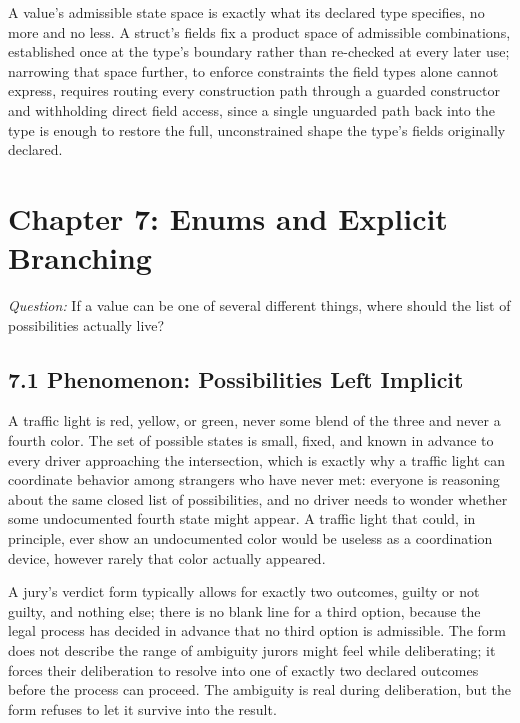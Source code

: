 \documentclass[11pt]{book}
\begin{document}
\begin{invariantbox}
A value's admissible state space is exactly what its declared type specifies, no more and no less. A struct's fields fix a product space of admissible combinations, established once at the type's boundary rather than re-checked at every later use; narrowing that space further, to enforce constraints the field types alone cannot express, requires routing every construction path through a guarded constructor and withholding direct field access, since a single unguarded path back into the type is enough to restore the full, unconstrained shape the type's fields originally declared.
\end{invariantbox}

\clearpage

\chapter*{Chapter 7: Enums and Explicit Branching}

\begin{firstprinciples}
\textit{Question:} If a value can be one of several different things, where should the list of possibilities actually live?
\end{firstprinciples}

\section*{7.1 Phenomenon: Possibilities Left Implicit}

A traffic light is red, yellow, or green, never some blend of the three and never a fourth color. The set of possible states is small, fixed, and known in advance to every driver approaching the intersection, which is exactly why a traffic light can coordinate behavior among strangers who have never met: everyone is reasoning about the same closed list of possibilities, and no driver needs to wonder whether some undocumented fourth state might appear. A traffic light that could, in principle, ever show an undocumented color would be useless as a coordination device, however rarely that color actually appeared.

A jury's verdict form typically allows for exactly two outcomes, guilty or not guilty, and nothing else; there is no blank line for a third option, because the legal process has decided in advance that no third option is admissible. The form does not describe the range of ambiguity jurors might feel while deliberating; it forces their deliberation to resolve into one of exactly two declared outcomes before the process can proceed. The ambiguity is real during deliberation, but the form refuses to let it survive into the result.
\end{document}
